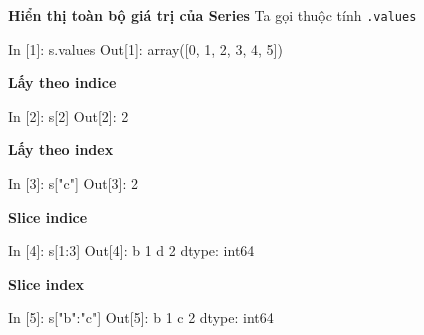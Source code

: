 \documentclass[
]{book}
\newenvironment{Shaded}{\begin{snugshade}}{\end{snugshade}}
\newcommand{\DecValTok}[1]{\textcolor[rgb]{0.00,0.00,0.81}{#1}}
\newcommand{\NormalTok}[1]{#1}
\newcommand{\StringTok}[1]{\textcolor[rgb]{0.31,0.60,0.02}{#1}}
\begin{document}
\textbf{Hiển thị toàn bộ giá trị của Series}
Ta gọi thuộc tính \texttt{.values}

\begin{Shaded}
\begin{Highlighting}[]
\NormalTok{In [}\DecValTok{1}\NormalTok{]: s.values}
\NormalTok{Out[}\DecValTok{1}\NormalTok{]:}
\NormalTok{array([}\DecValTok{0}\NormalTok{, }\DecValTok{1}\NormalTok{, }\DecValTok{2}\NormalTok{, }\DecValTok{3}\NormalTok{, }\DecValTok{4}\NormalTok{, }\DecValTok{5}\NormalTok{])}
\end{Highlighting}
\end{Shaded}

\textbf{Lấy theo indice}

\begin{Shaded}
\begin{Highlighting}[]
\NormalTok{In [}\DecValTok{2}\NormalTok{]: s[}\DecValTok{2}\NormalTok{]}
\NormalTok{Out[}\DecValTok{2}\NormalTok{]: }\DecValTok{2}
\end{Highlighting}
\end{Shaded}

\textbf{Lấy theo index}

\begin{Shaded}
\begin{Highlighting}[]
\NormalTok{In [}\DecValTok{3}\NormalTok{]: s[}\StringTok{"c"}\NormalTok{]}
\NormalTok{Out[}\DecValTok{3}\NormalTok{]: }\DecValTok{2} 
\end{Highlighting}
\end{Shaded}

\textbf{Slice indice}

\begin{Shaded}
\begin{Highlighting}[]
\NormalTok{In [}\DecValTok{4}\NormalTok{]: s[}\DecValTok{1}\NormalTok{:}\DecValTok{3}\NormalTok{]}
\NormalTok{Out[}\DecValTok{4}\NormalTok{]:}
\NormalTok{b    }\DecValTok{1}
\NormalTok{d    }\DecValTok{2}
\NormalTok{dtype: int64}
\end{Highlighting}
\end{Shaded}

\textbf{Slice index}

\begin{Shaded}
\begin{Highlighting}[]
\NormalTok{In [}\DecValTok{5}\NormalTok{]: s[}\StringTok{"b"}\NormalTok{:}\StringTok{"c"}\NormalTok{]}
\NormalTok{Out[}\DecValTok{5}\NormalTok{]: }
\NormalTok{b    }\DecValTok{1}
\NormalTok{c    }\DecValTok{2}
\NormalTok{dtype: int64}
\end{Highlighting}
\end{Shaded}
\end{document}

